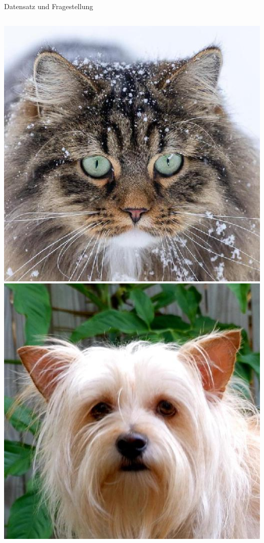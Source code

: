 \documentclass[aspectratio=1610, 9pt]{beamer}
\begin{document}
\begin{frame}{Datensatz und Fragestellung}
\begin{columns}
    \includegraphics[scale=0.13]{images/cat.jpg}\\
    \includegraphics[scale=0.13]{images/dog.jpg}\\

\end{columns}
\end{frame}
\end{document}
